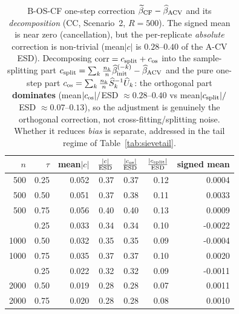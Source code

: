 \begin{table}[t]\centering\small
\caption{B-OS-CF one-step correction $\widetilde\beta_{\rm CF}-\widehat\beta_{\rm ACV}$ and its \emph{decomposition} (CC, Scenario~2, $R=500$). The signed mean is near zero (cancellation), but the per-replicate \emph{absolute} correction is non-trivial (mean$|c|$ is $0.28$--$0.40$ of the A-CV ESD). Decomposing $\mathrm{corr}=c_{\rm split}+c_{\rm os}$ into the sample-splitting part $c_{\rm split}=\sum_k\tfrac{n_k}{n}\widehat\beta^{(-k)}_{\rm init}-\widehat\beta_{\rm ACV}$ and the pure one-step part $c_{\rm os}=\sum_k\tfrac{n_k}{n}\widehat S_k^{-1}\widehat U_k$: the orthogonal part \textbf{dominates} (mean$|c_{\rm os}|/$ESD $\approx0.28$--$0.40$ vs mean$|c_{\rm split}|/$ESD $\approx0.07$--$0.13$), so the adjustment is genuinely the orthogonal correction, not cross-fitting/splitting noise. Whether it reduces \emph{bias} is separate, addressed in the tail regime of Table~\ref{tab:sievetail}.}
\label{tab:corr}\begin{tabular}{rr r rr rr}\toprule
$n$&$\tau$&mean$|c|$&$\tfrac{|c|}{\rm ESD}$&$\tfrac{|c_{\rm os}|}{\rm ESD}$&$\tfrac{|c_{\rm split}|}{\rm ESD}$&signed mean\\\midrule
500 & 0.25 & 0.052 & 0.37 & 0.37 & 0.12 & 0.0004 \\
500 & 0.50 & 0.051 & 0.37 & 0.38 & 0.11 & 0.0033 \\
500 & 0.75 & 0.056 & 0.40 & 0.40 & 0.13 & 0.0009 \\
\addlinespace
1000 & 0.25 & 0.033 & 0.34 & 0.34 & 0.10 & -0.0022 \\
1000 & 0.50 & 0.032 & 0.35 & 0.35 & 0.09 & -0.0004 \\
1000 & 0.75 & 0.035 & 0.37 & 0.37 & 0.10 & 0.0020 \\
\addlinespace
2000 & 0.25 & 0.022 & 0.32 & 0.32 & 0.09 & -0.0011 \\
2000 & 0.50 & 0.019 & 0.28 & 0.28 & 0.07 & 0.0011 \\
2000 & 0.75 & 0.020 & 0.28 & 0.28 & 0.08 & 0.0010 \\
\bottomrule\end{tabular}\end{table}
